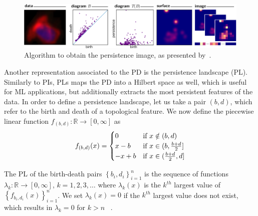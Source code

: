 \documentclass{article}
\begin{document}
\begin{figure}
  \begin{centering}
    \includegraphics[width=1.0\textwidth]{figures/cartoon.pdf}
    \caption{Algorithm to obtain the persistence image, as presented by~\citet{adams2017persistence}.}
    \label{fig:pipeline_persistence_image}
  \end{centering}
\end{figure}

Another representation associated to the PD is the persistence landscape (PL). Similarly to PIs, PLs
maps the PD into a Hilbert space as well, which is useful for ML applications, but additionally
extracts the most persistent features of the data. In order to define a persistence landscape, let
us take a pair $(b,d)$, which refer to the birth and death of a topological feature. We now define
the piecewise linear function $f_{(b,d)}:\mathbb{R} \to [0, \infty]$ as
\begin{equation}
  \label{eq:piecewise_linear_landscape}
  f_{(b,d)}(x)=
  \begin{cases}
    0 & \text{if }x \notin (b,d)\\ x-b & \text{if }x\in (b,{b+d\over 2}]\\ -x+b & \text{if }x\in
      ({b+d\over 2},d]
  \end{cases}
\end{equation}


The PL of the birth-death pairs $\left\{b_i,d_i\right\}_{i=1}^{n}$ is the sequence of functions
$\lambda_k:\mathbb{R}\to [0,\infty]$, $k=1,2,3,\ldots$ where $\lambda_k(x)$ is the $k^{th}$ largest
value of $\left\{f_{b_i, d_i}(x)\right\}^{n}_{i=1}$. We set $\lambda_k(x)=0$ if the $k^{th}$ largest
value does not exist, which results in $\lambda_k=0$ for $k>n$ ~\citep{bubenik2015statistical, bubenik2020persistence}.
\end{document}
